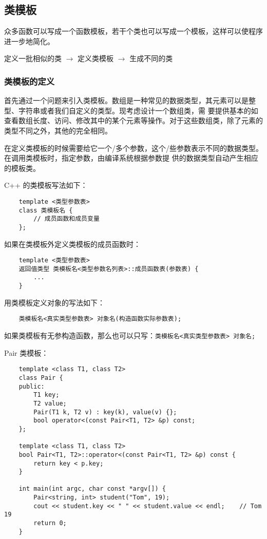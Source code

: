 \documentclass[UTF8]{ctexart}
\begin{document}
\subsection{类模板}
众多函数可以写成一个函数模板，若干个类也可以写成一个模板，这样可以使程序进一步地简化。

定义一批相似的类 $\rightarrow$ 定义类模板 $\rightarrow$ 生成不同的类

\subsubsection{类模板的定义}
首先通过一个问题来引入类模板。数组是一种常见的数据类型，其元素可以是整型、字符串或者我们自定义的类型。现考虑设计一个数组类，需
要提供基本的如查看数组长度、访问、修改其中的某个元素等操作。对于这些数组类，除了元素的类型不同之外，其他的完全相同。

在定义类模板的时候需要给它一个/多个参数，这个/些参数表示不同的数据类型。在调用类模板时，指定参数，由编译系统根据参数提
供的数据类型自动产生相应的模板类。

C++ 的类模板写法如下：
\begin{verbatim}
    template <类型参数表>
    class 类模板名 {
        // 成员函数和成员变量
    };
\end{verbatim}

如果在类模板外定义类模板的成员函数时：
\begin{verbatim}
    template <类型参数表>
    返回值类型 类模板名<类型参数名列表>::成员函数表(参数表) {
        ...
    }
\end{verbatim}

用类模板定义对象的写法如下：
\begin{verbatim}
    类模板名<真实类型参数表> 对象名(构造函数实际参数表);
\end{verbatim}

如果类模板有无参构造函数，那么也可以只写：\texttt{类模板名<真实类型参数表> 对象名;}

Pair 类模板：
\begin{verbatim}
    template <class T1, class T2>
    class Pair {
    public:
        T1 key;
        T2 value;
        Pair(T1 k, T2 v) : key(k), value(v) {};
        bool operator<(const Pair<T1, T2> &p) const;
    };

    template <class T1, class T2>
    bool Pair<T1, T2>::operator<(const Pair<T1, T2> &p) const {
        return key < p.key;
    }

    int main(int argc, char const *argv[]) {
        Pair<string, int> student("Tom", 19);
        cout << student.key << " " << student.value << endl;    // Tom 19
        return 0;
    }
\end{verbatim}
\end{document}
